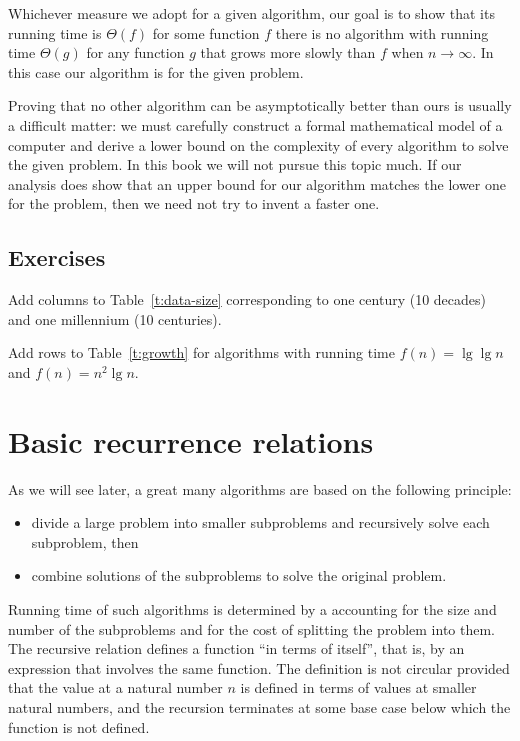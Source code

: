 Whichever measure we adopt for a given algorithm, our goal is  to show
that its running time is $\Theta(f)$ for some function $f$ 
there is no algorithm with running time $\Theta(g)$ for any function $g$
that grows more slowly than $f$ when $n \rightarrow \infty$. In this case
our algorithm is  for the given problem.

Proving that no other algorithm can be asymptotically better than
ours is usually a difficult matter: we must carefully construct a
formal mathematical model of a computer and derive a lower bound on the
complexity of every algorithm to solve the given problem. In this book
we will not pursue this topic much. If our analysis does show that an
upper bound for our algorithm matches the lower one for the problem,
then we need not try to invent a faster one.

 
\subsection*{Exercises}


\begin{Exercise}\label{exr:aa:data-size}
Add columns to Table~\ref{t:data-size} corresponding to
one century (10 decades) and one millennium (10 centuries).
\end{Exercise}

\begin{Exercise}\label{exr:aa:time-cmplx}
Add rows to Table~\ref{t:growth} for 
algorithms with running time \(f(n)=\lg\lg n\)
and \(f(n)=n^{2}\lg n\).
\end{Exercise}

\section{Basic recurrence relations}
\label{sec:recurrences}

As we will see later, a great many algorithms are
based on the following  principle:
\begin{itemize} 
\item divide a large problem into
smaller subproblems and recursively solve each subproblem, then 
\item combine solutions of the subproblems to
solve the original problem.
\end{itemize}
Running time of such algorithms is determined by
a  accounting for
the size and number of the subproblems and for the cost
of splitting the problem into them. The recursive 
relation defines a function ``in terms of itself'', that is, 
by an expression that involves the same function. The definition is not 
circular provided that the value at a natural number $n$ is defined in terms 
of values at smaller natural numbers, and the recursion terminates at some 
base case below which the function is not defined.

